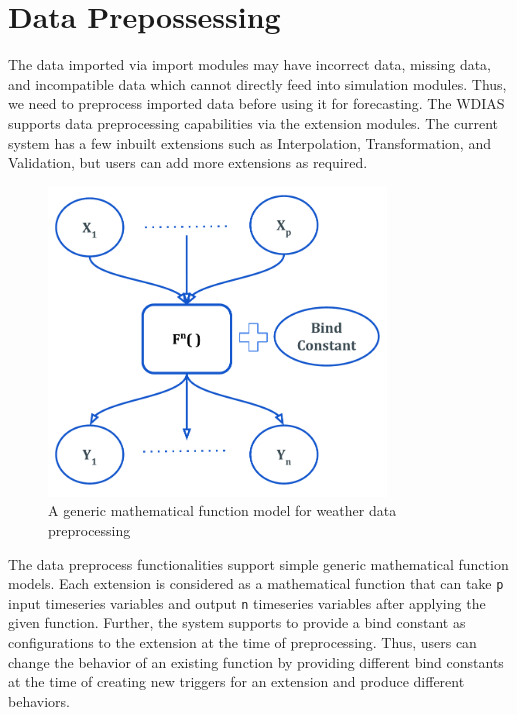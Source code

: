 \section{Data Prepossessing}
\label{se:data_preprocess}

The data imported via import modules may have incorrect data, missing data, and incompatible data which cannot directly feed into simulation modules.
Thus, we need to preprocess imported data before using it for forecasting. The WDIAS supports data preprocessing capabilities via the extension modules. The current system has a few inbuilt extensions such as Interpolation, Transformation, and Validation, but users can add more extensions as required.

\begin{figure}[htp]
    \centering
    \includegraphics[width=0.8\textwidth]{method/data_preprocess/weather_data_preprocessing.pdf}
    \caption{A generic mathematical function model for weather data preprocessing}
    \label{fi:weather_data_preprocessing}
\end{figure}

The data preprocess functionalities support simple generic mathematical function models. Each extension is considered as a mathematical function that can take \texttt{p} input timeseries variables and output \texttt{n} timeseries variables after applying the given function. Further, the system supports to provide a bind constant as configurations to the extension at the time of preprocessing. Thus, users can change the behavior of an existing function by providing different bind constants at the time of creating new triggers for an extension and produce different behaviors.

